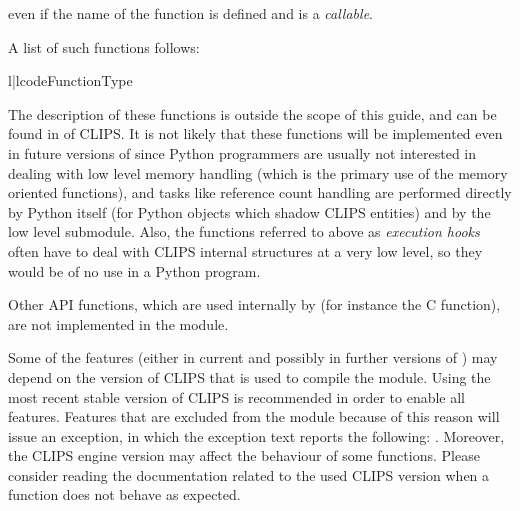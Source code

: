 even if the name of the function is defined and is a \emph{callable}.

A list of such functions follows:

\begin{tableii}{l|l}{code}{Function}{Type}
\end{tableii}

The description of these functions is outside the scope of this guide,
and can be found in \clipsapg{} of CLIPS. It is not likely that these
functions will be implemented even in future versions of \pyclips{} since
Python programmers are usually not interested in dealing with low level
memory handling (which is the primary use of the memory oriented
functions), and tasks like reference count handling are performed
directly by Python itself (for Python objects which shadow CLIPS
entities) and by the low level \pyclips{} submodule. Also, the functions
referred to above as \emph{execution hooks} often have to deal with CLIPS
internal structures at a very low level, so they would be of no use in a
Python program.

Other API functions, which are used internally by \pyclips{} (for
instance the  C function), are not
implemented in the module.

\begin{notice}
Some of the features (either in current and possibly in further versions
of \pyclips{}) may depend on the version of CLIPS that is used to compile
the module. Using the most recent stable version of CLIPS is recommended
in order to enable all \pyclips{} features. Features that are excluded
from the module because of this reason will issue an exception, in which
the exception text reports the following: . Moreover, the CLIPS engine version may affect the
behaviour of some functions. Please consider reading the documentation
related to the used CLIPS version when a function does not behave as
expected.
\end{notice}


